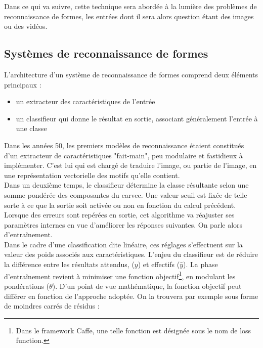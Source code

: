 \documentclass[a4paper,10pt]{report}
\begin{document}
Dans ce qui va suivre, cette technique sera abordée à la lumière des problèmes de reconnaissance de formes, les entrées dont il sera alors question étant des images ou des vidéos.

\subsection{Systèmes de reconnaissance de formes}

L'architecture d'un système de reconnaissance de formes comprend deux éléments principaux :

\begin{itemize}
  \item un extracteur des caractéristiques de l'entrée
  \item un classifieur qui donne le résultat en sortie, associant généralement l'entrée à une classe
\end{itemize}



Dans les années 50, les premiers modèles de reconnaissance étaient constitués d'un extracteur de caractéristiques "fait-main", peu modulaire et fastidieux à implémenter\cite{Bib_LeCun}.
C'est lui qui est chargé de traduire l'image, ou partie de l'image, en une représentation vectorielle des motifs qu'elle contient.
\\

Dans un deuxième temps, le classifieur détermine la classe résultante selon une somme pondérée des composantes du \gls{carvec}.
Une valeur seuil est fixée de telle sorte à ce que la sortie soit activée ou non en fonction du calcul précédent.
Lorsque des erreurs sont repérées en sortie, cet algorithme va réajuster ses paramètres internes en vue d'améliorer les réponses suivantes. On parle alors d'entraînement.
\\

Dans le cadre d'une classification dite linéaire, ces réglages s'effectuent sur la valeur des poids associés aux caractéristiques.
L'enjeu du classifieur est de réduire la différence entre les résultats attendus, ($y$) et effectifs ($\hat{y}$).
La phase d'entraînement revient à minimiser une fonction objectif\footnote{Dans le framework Caffe, une telle fonction est désignée sous le nom de loss function.}, en modulant les pondérations ($\theta$).
D'un point de vue mathématique, la fonction objectif peut différer en fonction de l'approche adoptée. On la trouvera par exemple sous forme de moindres carrés de résidus\cite{Bib_WikiLS} :
\end{document}
